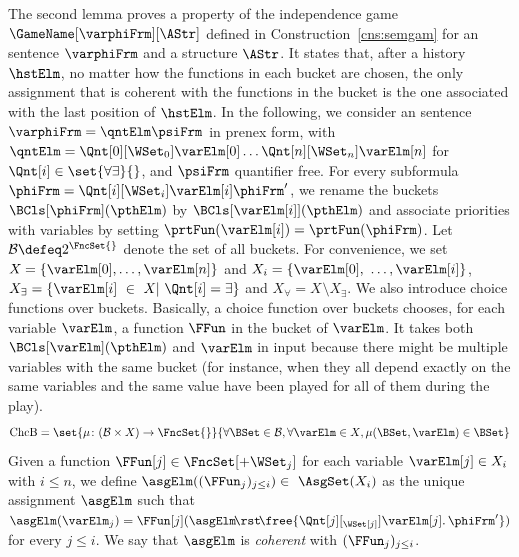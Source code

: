 \documentclass[authoryear]{elsarticle}
\newcommand{\asgChc}[1][i]{\asgElm((\FFun_j)_{j\leq #1})}
\newcommand{\VarX}[1][]{{X_{#1}}}
\newcommand{\Buckets}{\mathcal{B}}
\newcommand{\ChoiceFunsBuckets}{\text{ChcB}}
\newcommand{\choiceFunBucket}{\mu}
\begin{document}
The second lemma proves a property of the independence game
$\GameName[\varphiFrm][\AStr]$ defined in Construction~\ref{cns:semgam} for an
\ADIF sentence $\varphiFrm$ and a structure $\AStr$.  It states that, after a
history $\hstElm$, no matter how the functions in each bucket are chosen, the
only assignment that is coherent with the functions in the bucket is the one
associated with the last position of $\hstElm$.
%
In the following, we consider an \ADIF sentence $\varphiFrm = \qntElm \psiFrm$
in prenex form, with $\qntElm = \Qnt[0][\WSet_0]\varElm[0]
\ldots \Qnt[n][\WSet_n]\varElm[n]$ for $\Qnt[i]\in \set{\forall\exists}{}$, and
$\psiFrm$ quantifier free.
For every subformula $\phiFrm= \Qnt[i][\WSet_i]\varElm[i] \phiFrm'$, we rename
the buckets $\BCls[\phiFrm](\pthElm)$ by $\BCls[{\varElm[i]}](\pthElm)$ and
associate priorities with variables by setting $\prtFun(\varElm[i]) =
\prtFun(\phiFrm)$. Let $\Buckets \defeq 2^{\FncSet{}}$ denote the set of all
buckets. For convenience, we set $\VarX = \{\varElm[0], \ldots, \varElm[n]\}$
and $\VarX[i] = \{\varElm[0], \ldots, \varElm[i]\}$, $\VarX[\exists] =
\{\varElm[i] \in \VarX| \Qnt[i] = \exists\}$ and $\VarX[\forall] = \VarX
\setminus \VarX[\exists]$.  We also introduce choice functions over buckets.
Basically, a choice function over buckets chooses, for each variable $\varElm$,
a function $\FFun$ in the bucket of $\varElm$. It takes both
$\BCls[\varElm](\pthElm)$ and $\varElm$ in input because there might be multiple
variables with the same bucket (for instance, when they all depend exactly on
the same variables and the same value have been played for all of them during
the play).
%
\[
\ChoiceFunsBuckets= \set{ \choiceFunBucket \colon (\Buckets \times \VarX)
\rightarrow \FncSet{} }{ \forall \BSet \in \Buckets, \forall \varElm \in \VarX,
\choiceFunBucket(\BSet, \varElm) \in \BSet }
\]
%
Given a function $\FFun[j] \in \FncSet[+\WSet_{j}]{} $ for each variable
$\varElm[j] \in \VarX[i]$ with $i\leq n$, we define $\asgChc
\in \AsgSet(\VarX[i])$ as the unique assignment $\asgElm$ such that
$\asgElm(\varElm_j) = \FFun[{j}](\asgElm\!\rst\!  \free{\Qnt[j][_{\WSet[j]}]
  \varElm[j] \ldotp \phiFrm'})$ for every $j \leq i$. We say that $\asgElm$ is
\emph{coherent} with $(\FFun_j)_{j\leq i}$.
\end{document}
